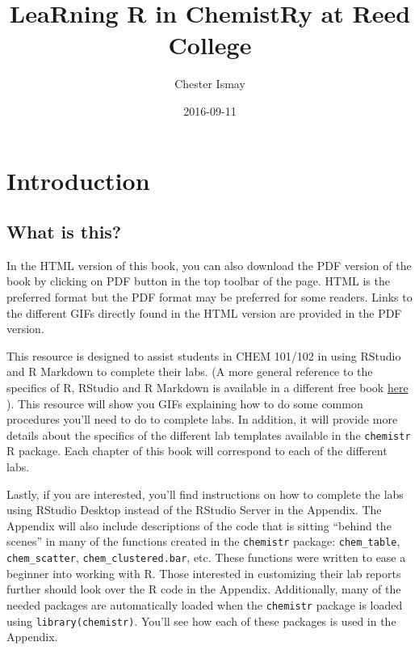 \documentclass[]{tufte-book}
\title{LeaRning R in ChemistRy at Reed College}
\author{Chester Ismay}
\date{2016-09-11}
\begin{document}
\maketitle



{
\setcounter{tocdepth}{1}
\tableofcontents
}

\chapter*{Introduction}\label{introduction}

\section*{What is this?}\label{what-is-this}

In the HTML version of this book, you can also download the PDF version
of the book by clicking on PDF button in the top toolbar of the page.
HTML is the preferred format but the PDF format may be preferred for
some readers. Links to the different GIFs directly found in the HTML
version are provided in the PDF version.

This resource is designed to assist students in CHEM 101/102 in using
RStudio and R Markdown to complete their labs. (A more general reference
to the specifics of R, RStudio and R Markdown is available in a
different free book \href{http://ismayc.github.io/rbasics-book}{here}
\citep{usedtor2016}). This resource will show you GIFs explaining how to
do some common procedures you'll need to do to complete labs. In
addition, it will provide more details about the specifics of the
different lab templates available in the \texttt{chemistr} R package.
Each chapter of this book will correspond to each of the different labs.

Lastly, if you are interested, you'll find instructions on how to
complete the labs using RStudio Desktop instead of the RStudio Server in
the Appendix. The Appendix will also include descriptions of the code
that is sitting ``behind the scenes'' in many of the functions created
in the \texttt{chemistr} package: \texttt{chem\_table},
\texttt{chem\_scatter}, \texttt{chem\_clustered.bar}, etc. These
functions were written to ease a beginner into working with R. Those
interested in customizing their lab reports further should look over the
R code in the Appendix. Additionally, many of the needed packages are
automatically loaded when the \texttt{chemistr} package is loaded using
\texttt{library(chemistr)}. You'll see how each of these packages is
used in the Appendix.
\end{document}
